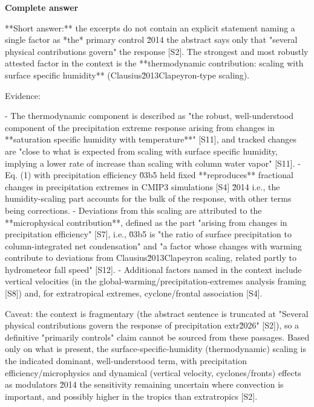 \documentclass[10pt]{article}
\begin{document}
\textbf{Complete answer}
\begin{AnswerText}
**Short answer:** the excerpts do not contain an explicit statement naming a single factor as *the* primary control \u2014 the abstract says only that "several physical contributions govern" the response [S2]. The strongest and most robustly attested factor in the context is the **thermodynamic contribution: scaling with surface specific humidity** (Clausius\u2013Clapeyron-type scaling).

Evidence:

- The thermodynamic component is described as "the robust, well-understood component of the precipitation extreme response arising from changes in **saturation specific humidity with temperature**" [S11], and tracked changes are "close to what is expected from scaling with surface specific humidity, implying a lower rate of increase than scaling with column water vapor" [S11].
- Eq. (1) with precipitation efficiency \u03b5 held fixed **reproduces** fractional changes in precipitation extremes in CMIP3 simulations [S4] \u2014 i.e., the humidity-scaling part accounts for the bulk of the response, with other terms being corrections.
- Deviations from this scaling are attributed to the **microphysical contribution**, defined as the part "arising from changes in precipitation efficiency" [S7], i.e., \u03b5 is "the ratio of surface precipitation to column-integrated net condensation" and "a factor whose changes with warming contribute to deviations from Clausius\u2013Clapeyron scaling, related partly to hydrometeor fall speed" [S12].
- Additional factors named in the context include vertical velocities (in the global-warming/precipitation-extremes analysis framing [S8]) and, for extratropical extremes, cyclone/frontal association [S4].

Caveat: the context is fragmentary (the abstract sentence is truncated at "Several physical contributions govern the response of precipitation extr\u2026" [S2]), so a definitive "primarily controls" claim cannot be sourced from these passages. Based only on what is present, the surface-specific-humidity (thermodynamic) scaling is the indicated dominant, well-understood term, with precipitation efficiency/microphysics and dynamical (vertical velocity, cyclones/fronts) effects as modulators \u2014 the sensitivity remaining uncertain where convection is important, and possibly higher in the tropics than extratropics [S2].
\end{AnswerText}
\end{document}
